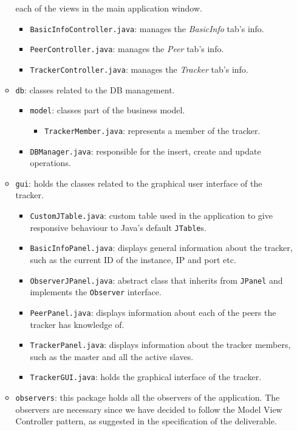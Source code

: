 \documentclass[twoside,a4paper,10pt]{article}
\begin{document}
\begin{itemize}
\begin{itemize}
    each of the views in the main application window.
    \begin{itemize}
    \item \texttt{BasicInfoController.java}:
      manages the \emph{BasicInfo} tab's info.
    \item \texttt{PeerController.java}:
      manages the \emph{Peer} tab's info.
    \item \texttt{TrackerController.java}:
      manages the \emph{Tracker} tab's info.
    \end{itemize}
  \item \texttt{db}: classes related to the DB management.
    \begin{itemize}
    \item \texttt{model}: classes part of the business model.
      \begin{itemize}
      \item \texttt{TrackerMember.java}: represents a member of the tracker.
      \end{itemize}
    \item \texttt{DBManager.java}: responsible for the insert, create and
      update operations.
    \end{itemize}
  \item \texttt{gui}: holds the classes related to the graphical user interface
    of the tracker.
    \begin{itemize}
    \item \texttt{CustomJTable.java}: custom table used in the application to
      give responsive behaviour to Java's default \texttt{JTable}s.
    \item \texttt{BasicInfoPanel.java}: displays general information about
      the tracker, such as the current ID of the instance, IP and port etc.
    \item \texttt{ObserverJPanel.java}: abstract class that inherits from
      \texttt{JPanel} and implements the \texttt{Observer} interface.
    \item \texttt{PeerPanel.java}: displays information about each of the
      peers the tracker has knowledge of.
    \item \texttt{TrackerPanel.java}: displays information about the tracker
      members, such as the master and all the active slaves.
    \item \texttt{TrackerGUI.java}: holds the graphical interface of the
      tracker.
    \end{itemize}
  \item \texttt{observers}: this package holds all the observers of the
    application.
    The observers are necessary since we have decided to follow the Model View
    Controller pattern, as suggested in the specification of the deliverable.
    

\end{itemize}
\end{itemize}
\end{document}

